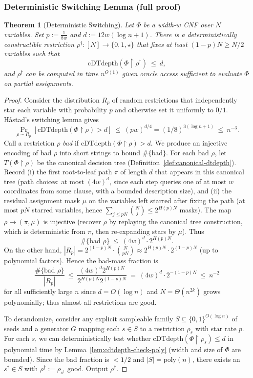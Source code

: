 \documentclass[12pt]{article}
\newtheorem{theorem}{Theorem}
\theoremstyle{definition}
\theoremstyle{definition}
\theoremstyle{remark}
\theoremstyle{remark}
\begin{document}
\subsubsection{Deterministic Switching Lemma (full proof)}

\begin{theorem}[Deterministic Switching]\label{thm:det-switching}
Let $\Phi$ be a width-$w$ CNF over $N$ variables. Set $p:=\frac{1}{8w}$ and $d:=12w(\log n+1)$. There is a deterministically constructible restriction $\rho^\dagger:[N]\to\{0,1,\star\}$ that fixes at least $(1-p)N\ge N/2$ variables such that
\[
\mathrm{cDTdepth}(\Phi\upharpoonright\rho^\dagger)\ \le\ d,
\]
and $\rho^\dagger$ can be computed in time $n^{O(1)}$ given oracle access sufficient to evaluate $\Phi$ on partial assignments.
\end{theorem}

\begin{proof}
Consider the distribution $R_p$ of random restrictions that independently star each variable with probability $p$ and otherwise set it uniformly to $0/1$. Håstad's switching lemma gives
\[
\Pr_{\rho\sim R_p}[\mathrm{cDTdepth}(\Phi\upharpoonright\rho)>d]\ \le\ (pw)^{d/4}=(1/8)^{3(\log n+1)}\ \le\ n^{-3}.
\]
Call a restriction $\rho$ \emph{bad} if $\mathrm{cDTdepth}(\Phi\upharpoonright\rho)>d$. We produce an injective encoding of bad $\rho$ into short strings to bound $\#\{\text{bad}\}$. For each bad $\rho$, let $T(\Phi\upharpoonright\rho)$ be the canonical decision tree (Definition~\ref{def:canonical-dtdepth}). Record (i) the first root-to-leaf path $\pi$ of length $d$ that appears in this canonical tree (path choices: at most $(4w)^d$, since each step queries one of at most $w$ coordinates from some clause, with a bounded description size), and (ii) the residual assignment mask $\mu$ on the variables left starred after fixing the path (at most $pN$ starred variables, hence $\sum_{j\le pN}\binom{N}{j}\le 2^{H(p)N}$ masks). The map $\rho\mapsto(\pi,\mu)$ is injective (recover $\rho$ by replaying the canonical tree construction, which is deterministic from $\pi$, then re-expanding stars by $\mu$). Thus
\[
\#\{\text{bad } \rho\}\ \le\ (4w)^d\cdot 2^{H(p)N}.
\]
On the other hand, $|R_p|=2^{(1-p)N}\cdot\binom{N}{pN}\approx 2^{H(p)N}\cdot 2^{(1-p)N}$ (up to polynomial factors). Hence the bad-mass fraction is
\[
\frac{\#\{\text{bad } \rho\}}{|R_p|}\ \le\ \frac{(4w)^d 2^{H(p)N}}{2^{H(p)N}2^{(1-p)N}}\ =\ (4w)^d\cdot 2^{-(1-p)N}\ \le\ n^{-2}
\]
for all sufficiently large $n$ since $d=O(\log n)$ and $N=\Theta(n^{2k})$ grows polynomially; thus almost all restrictions are good.

To derandomize, consider any explicit sampleable family $S\subseteq\{0,1\}^{O(\log n)}$ of seeds and a generator $G$ mapping each $s\in S$ to a restriction $\rho_s$ with star rate $p$. For each $s$, we can deterministically test whether $\mathrm{cDTdepth}(\Phi\upharpoonright\rho_s)\le d$ in polynomial time by Lemma~\ref{lem:cdtdepth-check-poly} (width and size of $\Phi$ are bounded). Since the bad fraction is $<1/2$ and $|S|=\mathrm{poly}(n)$, there exists an $s^\dagger\in S$ with $\rho^\dagger:=\rho_{s^\dagger}$ good. Output $\rho^\dagger$.
\end{proof}
\end{document}
